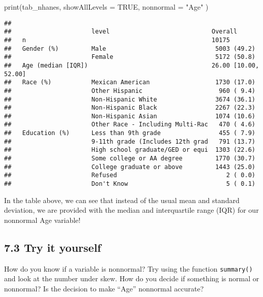 \documentclass[
]{book}
\newenvironment{Shaded}{\begin{snugshade}}{\end{snugshade}}
\newcommand{\AttributeTok}[1]{\textcolor[rgb]{0.77,0.63,0.00}{#1}}
\newcommand{\ConstantTok}[1]{\textcolor[rgb]{0.00,0.00,0.00}{#1}}
\newcommand{\FunctionTok}[1]{\textcolor[rgb]{0.00,0.00,0.00}{#1}}
\newcommand{\NormalTok}[1]{#1}
\newcommand{\StringTok}[1]{\textcolor[rgb]{0.31,0.60,0.02}{#1}}
\begin{document}
\begin{Shaded}
\begin{Highlighting}[]
\FunctionTok{print}\NormalTok{(tab\_nhanes, }
      \AttributeTok{showAllLevels =} \ConstantTok{TRUE}\NormalTok{,}
      \AttributeTok{nonnormal =} \StringTok{"Age"}
\NormalTok{     )}
\end{Highlighting}
\end{Shaded}

\begin{verbatim}
##                     
##                      level                            Overall             
##   n                                                   10175               
##   Gender (%)         Male                              5003 (49.2)        
##                      Female                            5172 (50.8)        
##   Age (median [IQR])                                  26.00 [10.00, 52.00]
##   Race (%)           Mexican American                  1730 (17.0)        
##                      Other Hispanic                     960 ( 9.4)        
##                      Non-Hispanic White                3674 (36.1)        
##                      Non-Hispanic Black                2267 (22.3)        
##                      Non-Hispanic Asian                1074 (10.6)        
##                      Other Race - Including Multi-Rac   470 ( 4.6)        
##   Education (%)      Less than 9th grade                455 ( 7.9)        
##                      9-11th grade (Includes 12th grad   791 (13.7)        
##                      High school graduate/GED or equi  1303 (22.6)        
##                      Some college or AA degree         1770 (30.7)        
##                      College graduate or above         1443 (25.0)        
##                      Refused                              2 ( 0.0)        
##                      Don't Know                           5 ( 0.1)
\end{verbatim}

In the table above, we can see that instead of the usual mean and standard deviation, we are provided with the median and interquartile range (IQR) for our nonnormal Age variable!

\hypertarget{try-it-yourself-36}{%
\subsection{7.3 Try it yourself}\label{try-it-yourself-36}}

How do you know if a variable is nonnormal? Try using the function \texttt{summary()} and look at the number under skew. How do you decide if something is normal or nonnormal? Is the decision to make ``Age'' nonnormal accurate?
\end{document}
